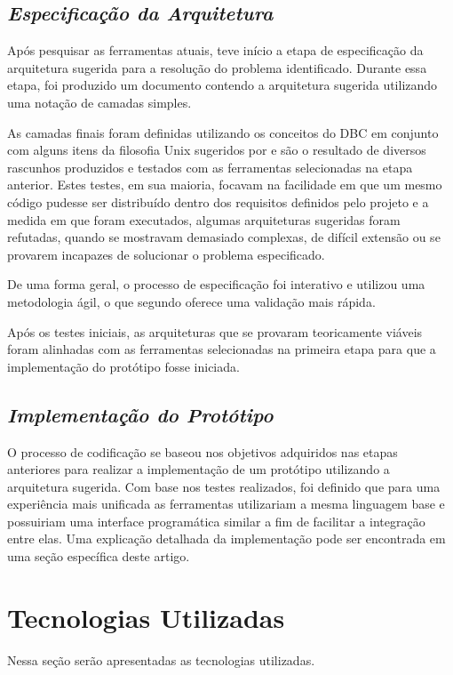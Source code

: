 \subsection{{\it Especificação da Arquitetura}}

Após pesquisar as ferramentas atuais, teve início a etapa de especificação da arquitetura sugerida para a resolução do problema identificado. Durante essa etapa, foi produzido um documento contendo a arquitetura sugerida utilizando uma notação de camadas simples.

As camadas finais foram definidas utilizando os conceitos do DBC em conjunto com alguns itens da filosofia Unix sugeridos por \cite{unixPhilosophy} e são o resultado de diversos rascunhos produzidos e testados com as ferramentas selecionadas na etapa anterior. Estes testes, em sua maioria, focavam na facilidade em que um mesmo código pudesse ser distribuído dentro dos requisitos definidos pelo projeto e a medida em que foram executados, algumas arquiteturas sugeridas foram refutadas, quando se mostravam demasiado complexas, de difícil extensão ou se provarem incapazes de solucionar o problema especificado. 

De uma forma geral, o processo de especificação foi interativo e utilizou uma metodologia ágil, o que segundo \cite{pressman2011} oferece uma validação mais rápida.

Após os testes iniciais, as arquiteturas que se provaram teoricamente viáveis foram alinhadas com as ferramentas selecionadas na primeira etapa para que a implementação do protótipo fosse iniciada.

\subsection{{\it Implementação do Protótipo}}

O processo de codificação se baseou nos objetivos adquiridos nas etapas anteriores para realizar a implementação de um protótipo utilizando a arquitetura sugerida. Com base nos testes realizados, foi definido que para uma experiência mais unificada as ferramentas utilizariam a mesma linguagem base e possuiriam uma interface programática similar a fim de facilitar a integração entre elas. Uma explicação detalhada da implementação pode ser encontrada em uma seção específica deste artigo.

\section{\esp Tecnologias Utilizadas}
Nessa seção serão apresentadas as tecnologias utilizadas.


